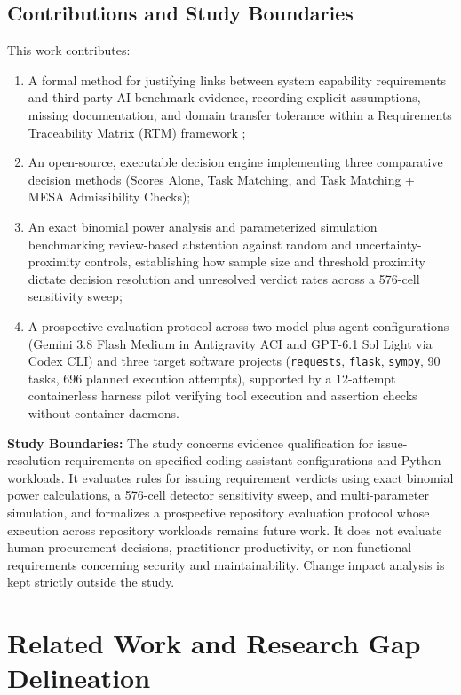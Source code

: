 \documentclass[runningheads]{llncs}
\begin{document}
\subsection{Contributions and Study Boundaries}
This work contributes:
\begin{enumerate}[leftmargin=*]
    \item A formal method for justifying links between system capability requirements and third-party AI benchmark evidence, recording explicit assumptions, missing documentation, and domain transfer tolerance within a Requirements Traceability Matrix (RTM) framework \cite{gotel_traceability_1994};
    \item An open-source, executable decision engine implementing three comparative decision methods (Scores Alone, Task Matching, and Task Matching + MESA Admissibility Checks);
    \item An exact binomial power analysis and parameterized simulation benchmarking review-based abstention against random and uncertainty-proximity controls, establishing how sample size and threshold proximity dictate decision resolution and unresolved verdict rates across a 576-cell sensitivity sweep;
    \item A prospective evaluation protocol across two model-plus-agent configurations (Gemini 3.8 Flash Medium in Antigravity ACI and GPT-6.1 Sol Light via Codex CLI) and three target software projects (\texttt{requests}, \texttt{flask}, \texttt{sympy}, 90 tasks, 696 planned execution attempts), supported by a 12-attempt containerless harness pilot verifying tool execution and assertion checks without container daemons.
\end{enumerate}

\textbf{Study Boundaries:} The study concerns evidence qualification for issue-resolution requirements on specified coding assistant configurations and Python workloads. It evaluates rules for issuing requirement verdicts using exact binomial power calculations, a 576-cell detector sensitivity sweep, and multi-parameter simulation, and formalizes a prospective repository evaluation protocol whose execution across repository workloads remains future work. It does not evaluate human procurement decisions, practitioner productivity, or non-functional requirements concerning security and maintainability. Change impact analysis is kept strictly outside the study.

\section{Related Work and Research Gap Delineation}
\label{sec:related_work}
\end{document}
